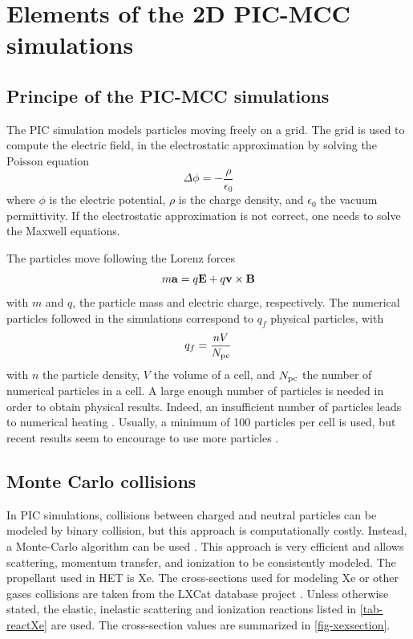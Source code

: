 
\section{Elements of the 2D PIC-MCC simulations}
  \label{sec-elements}
  \subsection{Principe of the PIC-MCC simulations}
    \label{subsec-intro}
    The \ac{PIC} simulation models particles moving freely on a grid.
    The grid is used to compute the electric field, in the electrostatic approximation by solving the Poisson equation
    \begin{equation}
      \label{eq-poisson}
      \Delta \phi = - \frac{\rho}{\epsilon_0}
    \end{equation}
    where $\phi$ is the electric potential, $\rho$ is the charge density, and $\epsilon_0$ the vacuum permittivity.
    If the electrostatic approximation is not correct, one needs to solve the Maxwell equations.

    The particles move following the Lorenz forces
    \begin{equation}
      \label{eq-Lor}
      m {\bf a} = q {\mathbf E} + q {\bf v} \times {\bf B}
    \end{equation}
    with $m$ and $q$, the particle mass and electric charge, respectively.
    The numerical particles followed in the simulations correspond to $q_f$ physical particles, with
    \begin{equation}
      q_f = \frac{n V}{N_{\rm pc}}
    \end{equation}
    with $n$ the particle density, $V$ the volume of a cell, and $N_{\rm pc}$ the number of numerical particles in a cell.
    A large enough number of particles is needed in order to obtain physical results.
    Indeed, an insufficient number of particles leads to numerical heating \cite{ueda1994}.
    Usually, a minimum of 100 particles per cell is used, but recent results seem to encourage to use more particles \cite{janhunen2018}.

  \subsection{Monte Carlo collisions}

    In \ac{PIC} simulations, collisions between charged and neutral particles can be modeled by binary collision, but this approach is computationally costly.
    Instead, a Monte-Carlo algorithm can be used \cite{vahedi1995}.
    This approach is very efficient and allows scattering, momentum transfer, and ionization to be consistently modeled.
    The propellant used in \ac{HET} is \ac{Xe}.
    The cross-sections used for modeling \ac{Xe} or other gases collisions are taken from the {\sc LXCat} database project \cite{LXCat_web,pancheshnyi2012}.
    Unless otherwise stated, the elastic, inelastic scattering and ionization reactions listed in \cref{tab-reactXe} are used.
    The cross-section values are summarized in \cref{fig-xexsection}.

